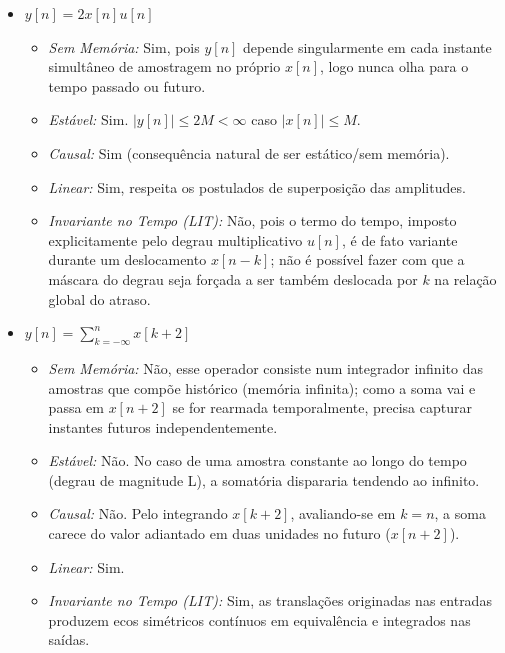 \documentclass[tcc]{classe_uftex/uftex}
\begin{document}
\begin{itemize}
    \item[\textbf{a)}] $y[n] = 2x[n]u[n]$
    \begin{itemize}
        \item \textit{Sem Memória:} Sim, pois $y[n]$ depende singularmente em cada instante simultâneo de amostragem no próprio $x[n]$, logo nunca olha para o tempo passado ou futuro.
        \item \textit{Estável:} Sim. $|y[n]| \le 2M < \infty$ caso $|x[n]| \le M$.
        \item \textit{Causal:} Sim (consequência natural de ser estático/sem memória).
        \item \textit{Linear:} Sim, respeita os postulados de superposição das amplitudes.
        \item \textit{Invariante no Tempo (LIT):} Não, pois o termo do tempo, imposto explicitamente pelo degrau multiplicativo $u[n]$, é de fato variante durante um deslocamento $x[n-k]$; não é possível fazer com que a máscara do degrau seja forçada a ser também deslocada por $k$ na relação global do atraso.
    \end{itemize}
    
    \item[\textbf{b)}] $y[n] = \sum_{k=-\infty}^{n} x[k+2]$
    \begin{itemize}
        \item \textit{Sem Memória:} Não, esse operador consiste num integrador infinito das amostras que compõe histórico (memória infinita); como a soma vai e passa em $x[n+2]$ se for rearmada temporalmente, precisa capturar instantes futuros independentemente.
        \item \textit{Estável:} Não. No caso de uma amostra constante ao longo do tempo (degrau de magnitude L), a somatória dispararia tendendo ao infinito.
        \item \textit{Causal:} Não. Pelo integrando $x[k+2]$, avaliando-se em $k=n$, a soma carece do valor adiantado em duas unidades no futuro ($x[n+2]$).
        \item \textit{Linear:} Sim.
        \item \textit{Invariante no Tempo (LIT):} Sim, as translações originadas nas entradas produzem ecos simétricos contínuos em equivalência e integrados nas saídas.
    \end{itemize}


\end{itemize}
\end{document}
